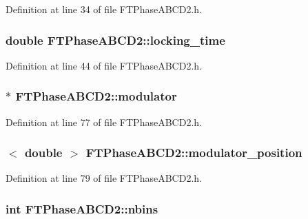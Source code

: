 Definition at line 34 of file FTPhaseABCD2.h.

\hypertarget{classFTPhaseABCD2_af4c9fb7aeb95a2bf45cbfcf7aa0c1eca}{
\subsubsection[{locking\_\-time}]{\setlength{\rightskip}{0pt plus 5cm}double {\bf FTPhaseABCD2::locking\_\-time}}}
\label{classFTPhaseABCD2_af4c9fb7aeb95a2bf45cbfcf7aa0c1eca}


Definition at line 44 of file FTPhaseABCD2.h.

\hypertarget{classFTPhaseABCD2_a1755a23fa779636dab93ffb9c9b93e6b}{
\subsubsection[{modulator}]{$\ast$ {\bf FTPhaseABCD2::modulator}}}
\label{classFTPhaseABCD2_a1755a23fa779636dab93ffb9c9b93e6b}


Definition at line 77 of file FTPhaseABCD2.h.

\hypertarget{classFTPhaseABCD2_a248bbc1dccd7a072e8e61710e4ae2259}{
\subsubsection[{modulator\_\-position}]{$<$ double $>$ {\bf FTPhaseABCD2::modulator\_\-position}}}
\label{classFTPhaseABCD2_a248bbc1dccd7a072e8e61710e4ae2259}


Definition at line 79 of file FTPhaseABCD2.h.

\hypertarget{classFTPhaseABCD2_acbcfd8097caa8e93a79957b479448202}{
\subsubsection[{nbins}]{\setlength{\rightskip}{0pt plus 5cm}int {\bf FTPhaseABCD2::nbins}}}
\label{classFTPhaseABCD2_acbcfd8097caa8e93a79957b479448202}


